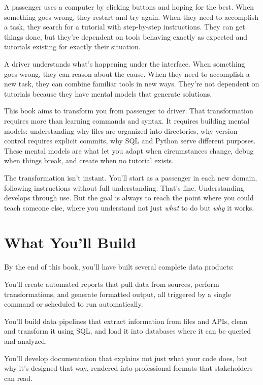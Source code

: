 \documentclass[
  letterpaper,
  DIV=11,
  numbers=noendperiod]{scrreprt}
\begin{document}
A passenger uses a computer by clicking buttons and hoping for the best.
When something goes wrong, they restart and try again. When they need to
accomplish a task, they search for a tutorial with step-by-step
instructions. They can get things done, but they're dependent on tools
behaving exactly as expected and tutorials existing for exactly their
situation.

A driver understands what's happening under the interface. When
something goes wrong, they can reason about the cause. When they need to
accomplish a new task, they can combine familiar tools in new ways.
They're not dependent on tutorials because they have mental models that
generate solutions.

This book aims to transform you from passenger to driver. That
transformation requires more than learning commands and syntax. It
requires building mental models: understanding why files are organized
into directories, why version control requires explicit commits, why SQL
and Python serve different purposes. These mental models are what let
you adapt when circumstances change, debug when things break, and create
when no tutorial exists.

The transformation isn't instant. You'll start as a passenger in each
new domain, following instructions without full understanding. That's
fine. Understanding develops through use. But the goal is always to
reach the point where you could teach someone else, where you understand
not just \emph{what} to do but \emph{why} it works.

\section*{What You'll Build}\label{what-youll-build}


By the end of this book, you'll have built several complete data
products:

You'll create automated reports that pull data from sources, perform
transformations, and generate formatted output, all triggered by a
single command or scheduled to run automatically.

You'll build data pipelines that extract information from files and
APIs, clean and transform it using SQL, and load it into databases where
it can be queried and analyzed.

You'll develop documentation that explains not just what your code does,
but why it's designed that way, rendered into professional formats that
stakeholders can read.
\end{document}
